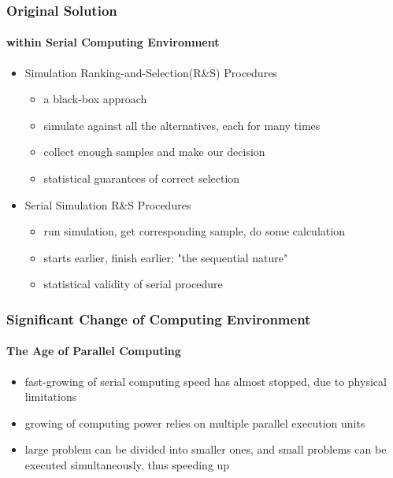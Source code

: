 \documentclass{beamer}
\begin{document}
\begin{frame}
\frametitle{Original Solution}
\framesubtitle{within Serial Computing Environment}
\begin{itemize}
\item Simulation Ranking-and-Selection(R\&S) Procedures
\begin{itemize}
\item a black-box approach
\item simulate against all the alternatives, each for many times
\item collect enough samples and make our decision
\item statistical guarantees of correct selection
\end{itemize}
\vspace{\baselineskip}
\item Serial Simulation R\&S Procedures
\begin{itemize}
\item run simulation, get corresponding sample, do some calculation
\item starts earlier, finish earlier: "the sequential nature"
\item statistical validity of serial procedure
\end{itemize}
\end{itemize}
\end{frame}

\begin{frame}
\frametitle {Significant Change of Computing Environment}
\framesubtitle{The Age of Parallel Computing}
\begin{itemize}
\item fast-growing of serial computing speed has almost stopped, due to physical limitations
\vspace{\baselineskip}
\item growing of computing power relies on multiple parallel execution units
\vspace{\baselineskip}
\item large problem can be divided into smaller ones, and small problems can be executed simultaneously, thus speeding up
\end{itemize}
\end{frame}
\end{document}
